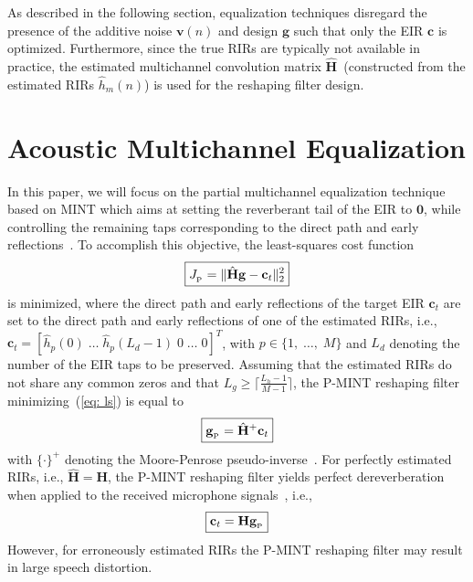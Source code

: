 \documentclass{article}
\begin{document}
As described in the following section, equalization techniques disregard the presence of the additive noise $\mathbf{v}(n)$ and design $\mathbf{g}$ such that only the EIR $\mathbf{c}$ is optimized. 
Furthermore, since the true RIRs are typically not available in practice, the estimated multichannel convolution matrix $\hat{\mathbf{H}}$~(constructed from the estimated RIRs $\hat{h}_m(n)$) is used for the reshaping filter design.

\section{Acoustic Multichannel Equalization}
\label{sec: ame}
In this paper, we will focus on the partial multichannel equalization technique based on MINT which aims at setting the reverberant tail of the EIR to $\mathbf{0}$, while controlling the remaining taps corresponding to the direct path and early reflections~\cite{Kodrasi_ITASLP_2013}. 
To accomplish this objective, the least-squares cost function
\begin{equation}
\label{eq: ls}
\boxed{J_{_{\rm P}} = \|\hat{\mathbf{H}}\mathbf{g} - \mathbf{c}_t  \|_2^2}
\end{equation}
is minimized, where the direct path and early reflections of the target EIR $\mathbf{c}_t$ are set to the direct path and early reflections of one of the estimated RIRs, i.e., $\mathbf{c}_t = [\hat{h}_p(0)\; \ldots\; \hat{h}_p(L_d-1) \; 0 \; \ldots \; 0 ]^{T}$, with $p \in \{1, \; \ldots, \; M\}$ and $L_d$ denoting the number of the EIR taps to be preserved.
Assuming that the estimated RIRs do not share any common zeros and that $L_g \geq \lceil{\frac{L_h-1}{M-1}\rceil}$, the P-MINT reshaping filter minimizing~(\ref{eq: ls}) is equal to~\cite{Kodrasi_ITASLP_2013}
\begin{equation}
  \label{eq: fpmint}
  \boxed{\mathbf{g}_{_{\rm P}} = \hat{\mathbf{H}}^+\mathbf{c}_t}
\end{equation}
with $\{\cdot\}^+$ denoting the Moore-Penrose pseudo-inverse~\cite{Golub_Matrix_book}. 
For perfectly estimated RIRs, i.e., $\hat{\mathbf{H}} = \mathbf{H}$, the P-MINT reshaping filter yields perfect dereverberation when applied to the received microphone signals~\cite{Kodrasi_ITASLP_2013}, i.e.,
\begin{equation}
  \label{eq: peir}
   \boxed{\mathbf{c}_t = \mathbf{H}\mathbf{g}_{_{\rm P}}}
\end{equation}
However, for erroneously estimated RIRs the P-MINT reshaping filter may result in large speech distortion.
\end{document}
